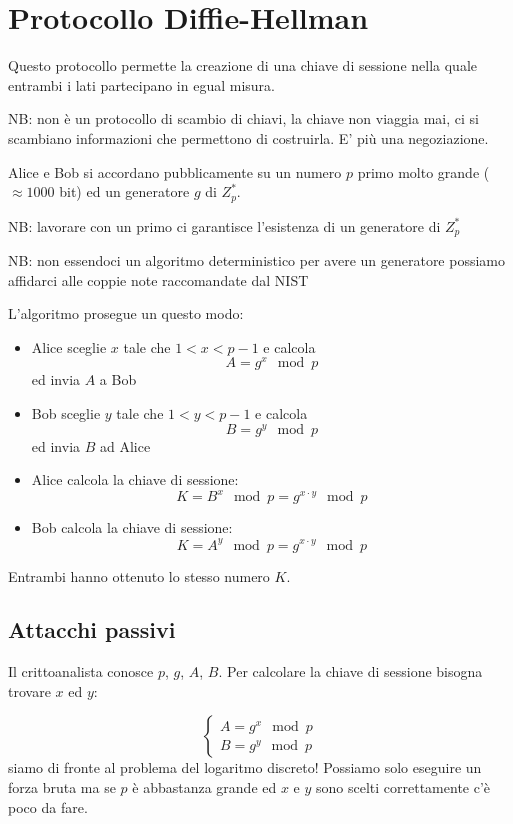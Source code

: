 \section{Protocollo Diffie-Hellman}
Questo protocollo permette la creazione di una chiave di sessione nella quale entrambi i lati partecipano in egual misura.

NB: non è un protocollo di scambio di chiavi, la chiave non viaggia mai, ci si scambiano informazioni che permettono di costruirla. E' più una negoziazione.

Alice e Bob si accordano pubblicamente su un numero $p$ primo molto grande ($\approx 1000$ bit) ed un generatore $g$ di $Z_p^*$. 

NB: lavorare con un primo ci garantisce l'esistenza di un generatore di $Z_p^*$

NB: non essendoci un algoritmo deterministico per avere un generatore possiamo affidarci alle coppie note raccomandate dal NIST

L'algoritmo prosegue un questo modo:
\begin{itemize}
    \item Alice sceglie $x$ tale che $1 < x < p-1$ e calcola
    $$ A = g^x \mod p $$
    ed invia $A$ a Bob
    \item Bob sceglie $y$ tale che $1 < y < p-1$ e calcola
    $$ B = g^y \mod p $$
    ed invia $B$ ad Alice
    \item Alice calcola la chiave di sessione:
    $$ K = B^x \mod p = g^{x \cdot y} \mod p $$
    \item Bob calcola la chiave di sessione:
    $$ K = A^y \mod p = g^{x \cdot y} \mod p $$
\end{itemize}
Entrambi hanno ottenuto lo stesso numero $K$.

\subsection{Attacchi passivi}
Il crittoanalista conosce $p$, $g$, $A$, $B$.
Per calcolare la chiave di sessione bisogna trovare $x$ ed $y$:

\begin{equation}
    \begin{cases}
    A = g^x \mod p \\
    B = g^y \mod p
    \end{cases}
\end{equation}
siamo di fronte al problema del logaritmo discreto! Possiamo solo eseguire un forza bruta ma se $p$ è abbastanza grande ed $x$ e $y$ sono scelti correttamente c'è poco da fare.


